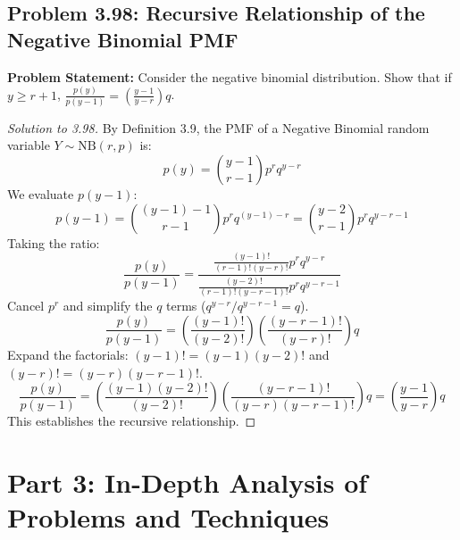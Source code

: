 \documentclass[11pt, letterpaper]{article}
\theoremstyle{definition}
\theoremstyle{remark}
\begin{document}
\subsection{Problem 3.98: Recursive Relationship of the Negative Binomial PMF}
\textbf{Problem Statement:} Consider the negative binomial distribution. Show that if $y \ge r+1$, $\frac{p(y)}{p(y-1)} = \left(\frac{y-1}{y-r}\right)q$.

\begin{proof}[Solution to 3.98]
By Definition 3.9, the PMF of a Negative Binomial random variable $Y \sim \mathrm{NB}(r, p)$ is:
\[ p(y) = \binom{y-1}{r-1} p^r q^{y-r} \]
We evaluate $p(y-1)$:
\[ p(y-1) = \binom{(y-1)-1}{r-1} p^r q^{(y-1)-r} = \binom{y-2}{r-1} p^r q^{y-r-1} \]
Taking the ratio:
\[ \frac{p(y)}{p(y-1)} = \frac{\frac{(y-1)!}{(r-1)!(y-r)!} p^r q^{y-r}}{\frac{(y-2)!}{(r-1)!(y-r-1)!} p^r q^{y-r-1}} \]
Cancel $p^r$ and simplify the $q$ terms ($q^{y-r} / q^{y-r-1} = q$).
\[ \frac{p(y)}{p(y-1)} = \left( \frac{(y-1)!}{(y-2)!} \right) \left( \frac{(y-r-1)!}{(y-r)!} \right) q \]
Expand the factorials: $(y-1)! = (y-1)(y-2)!$ and $(y-r)! = (y-r)(y-r-1)!$.
\[ \frac{p(y)}{p(y-1)} = \left( \frac{(y-1)(y-2)!}{(y-2)!} \right) \left( \frac{(y-r-1)!}{(y-r)(y-r-1)!} \right) q = \left( \frac{y-1}{y-r} \right) q \]
This establishes the recursive relationship.
\end{proof}

\newpage

\section{Part 3: In-Depth Analysis of Problems and Techniques}
\end{document}
